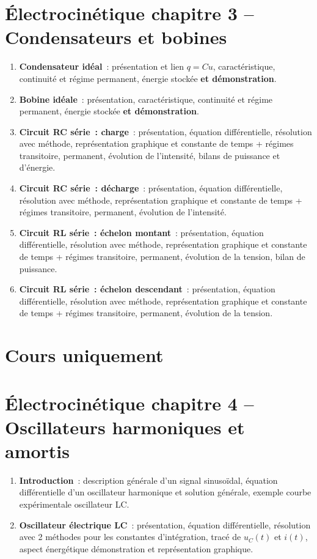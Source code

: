 \documentclass[a4paper, 12pt, final, garamond]{book}
\begin{document}
\section*{Électrocinétique chapitre 3 -- Condensateurs et bobines}
\begin{enumerate}[label=\Roman*]
    \item \textbf{Condensateur idéal}~: présentation et lien $q=Cu$,
        caractéristique, continuité et régime permanent, énergie stockée
        \textbf{et démonstration}.
    \item \textbf{Bobine idéale}~: présentation, caractéristique, continuité et
        régime permanent, énergie stockée \textbf{et démonstration}.
    \item \textbf{Circuit RC série~: charge}~: présentation, équation
        différentielle, résolution avec méthode, représentation graphique et
        constante de temps + régimes transitoire, permanent, évolution de
        l'intensité, bilans de puissance et d'énergie.
    \item \textbf{Circuit RC série~: décharge}~: présentation, équation
        différentielle, résolution avec méthode, représentation graphique et
        constante de temps + régimes transitoire, permanent, évolution de
        l'intensité.
    \item \textbf{Circuit RL série~: échelon montant}~: présentation, équation
        différentielle, résolution avec méthode, représentation graphique et
        constante de temps + régimes transitoire, permanent, évolution de
        la tension, bilan de puissance.
    \item \textbf{Circuit RL série~: échelon descendant}~: présentation, équation
        différentielle, résolution avec méthode, représentation graphique et
        constante de temps + régimes transitoire, permanent, évolution de
        la tension.
\end{enumerate}

\section{Cours uniquement}
\section*{Électrocinétique chapitre 4 -- Oscillateurs harmoniques et amortis}

\begin{enumerate}[label=\Roman*]
    \item \textbf{Introduction}~: description générale d'un signal sinusoïdal,
        équation différentielle d'un oscillateur harmonique et solution
        générale, exemple courbe expérimentale oscillateur LC.
    \item \textbf{Oscillateur électrique LC}~: présentation, équation
        différentielle, résolution avec 2 méthodes pour les constantes
        d'intégration, tracé de $u_C(t)$ et $i(t)$, aspect énergétique
        démonstration et représentation graphique.
\end{enumerate}
\end{document}
